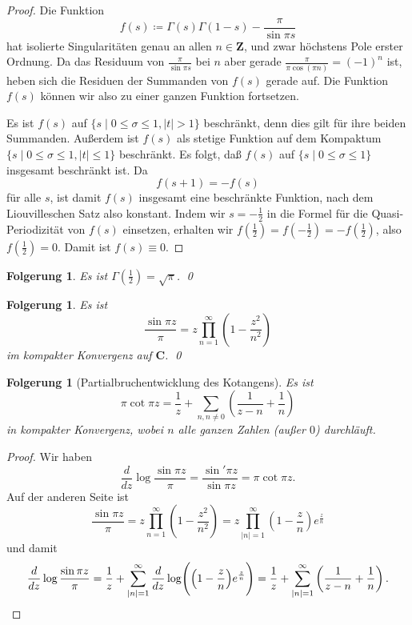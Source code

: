 \documentclass[a4paper,twoside,openright]{report}
\newtheorem{cor}[thm]{Folgerung}
\theoremstyle{definition}
\theoremstyle{remark}
\begin{document}
\begin{proof}
  Die Funktion
  \[
    f(s) \coloneqq \Gamma(s) \Gamma(1 - s) - \frac{\pi}{\sin \pi s}
  \]
  hat isolierte Singularitäten genau an allen $n \in \mathbf Z$, und zwar höchstens
  Pole erster Ordnung. Da das Residuum von $\frac \pi{\sin \pi s}$ bei $n$
  aber gerade $\frac {\pi}{\pi \cos(\pi n)} = (-1)^n$ ist, heben sich die Residuen
  der Summanden von $f(s)$ gerade auf. Die Funktion $f(s)$ können wir also zu
  einer ganzen Funktion fortsetzen.
  
  Es ist $f(s)$ auf $\{s \mid 0 \leq \sigma \leq 1, |t| > 1\}$ beschränkt, denn
  dies gilt für ihre beiden Summanden. Außerdem ist $f(s)$ als stetige Funktion
  auf dem Kompaktum $\{s \mid 0 \leq \sigma \leq 1, |t| \leq 1\}$ beschränkt.
  Es folgt, daß $f(s)$ auf $\{s \mid 0 \leq \sigma \leq 1\}$ insgesamt beschränkt
  ist. Da
  \[
    f(s + 1) = - f(s)
  \]
  für alle $s$, ist damit $f(s)$ insgesamt eine beschränkte Funktion, nach dem
  Liouvilleschen Satz also konstant. Indem wir $s = -\frac 1 2$ in die Formel für die
  Quasi-Periodizität von $f(s)$ einsetzen, erhalten wir $f(\frac 1 2) = f(-\frac 1 2) =  - f(\frac 1 2)$, also
  $f(\frac 1 2) = 0$. Damit ist $f(s) \equiv 0$. 
\end{proof}

\begin{cor}
  Es ist $\Gamma(\frac 1 2) = \sqrt{\pi}$.
  \qed
\end{cor}

\begin{cor}
  Es ist
  \[
    \frac{\sin \pi z}{\pi} = z \prod_{n = 1}^\infty \left(1 - \frac{z^2}{n^2}\right)
  \]
  im kompakter Konvergenz auf $\mathbf C$.
  \qed
\end{cor}

\begin{cor}[Partialbruchentwicklung des Kotangens]
  Es ist
  \[
    \pi\cot \pi z = \frac 1 z + \sum_{n, n \neq 0} \left(\frac{1}{z - n} + \frac 1 n\right)
  \]
  in kompakter Konvergenz, wobei $n$ alle ganzen Zahlen (außer $0$) durchläuft.
\end{cor}

\begin{proof}
  Wir haben
  \[
    \frac d {dz} \log \frac{\sin \pi z}{\pi} = \frac{\sin'\pi z}{\sin \pi z}
    = \pi \cot \pi z.
  \]
  Auf der anderen Seite ist
  \[
    \frac{\sin \pi z}{\pi} = z \prod_{n = 1}^\infty \left(1 - \frac{z^2}{n^2}\right)
    = z \prod_{|n| = 1}^\infty \left(1 - \frac z n\right) e^{\frac z n}
  \]
  und damit
  \[
    \frac d {dz} \log \frac{\sin \pi z}{\pi} = \frac 1 z + \sum_{|n| = 1}^\infty
    \frac d {dz} \log \Biggl(\Bigl(1 - \frac z n\Bigr) e^{\frac z n}\Biggr)
    = \frac 1 z + \sum_{|n| = 1}^\infty \left(\frac 1 {z - n} + \frac 1 n\right).  
    \qedhere
  \]
\end{proof}
 
\end{document}
